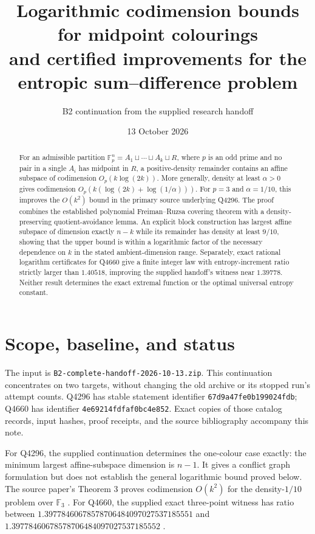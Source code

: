\documentclass[11pt]{article}
\title{\vspace{-12mm}\textbf{Logarithmic codimension bounds for midpoint colourings}\\[3pt]
\large and certified improvements for the entropic sum--difference problem}
\author{B2 continuation from the supplied research handoff}
\date{13 October 2026}
\theoremstyle{remark}
\newcommand{\Fp}{\mathbb F_p}
\newcommand{\Fthree}{\mathbb F_3}
\begin{document}
\maketitle
\vspace{-6mm}
\begin{abstract}
For an admissible partition $\Fp^n=A_1\sqcup\cdots\sqcup A_k\sqcup R$, where
$p$ is an odd prime and no pair in a single $A_i$ has midpoint in $R$, a
positive-density remainder contains an affine subspace of codimension
$O_p(k\log(2k))$. More generally, density at least $\alpha>0$ gives codimension
$O_p(k(\log(2k)+\log(1/\alpha)))$. For $p=3$ and $\alpha=1/10$, this improves
the $O(k^2)$ bound in the primary source underlying Q4296.
The proof combines the established polynomial Freiman--Ruzsa covering theorem
with a density-preserving quotient-avoidance lemma. An explicit block
construction has largest affine subspace of dimension exactly $n-k$ while
its remainder has density at least $9/10$, showing that the upper bound is
within a logarithmic factor of the necessary dependence on $k$ in the stated
ambient-dimension range. Separately, exact rational logarithm certificates
for Q4660 give a finite integer law with entropy-increment ratio strictly
larger than $1.40518$, improving the supplied handoff's witness near $1.39778$.
Neither result determines the exact extremal function or the optimal
universal entropy constant.
\end{abstract}

\section{Scope, baseline, and status}

The input is \texttt{B2-complete-handoff-2026-10-13.zip}. This continuation
concentrates on two targets, without changing the old archive or its stopped
run's attempt counts. Q4296 has stable statement identifier
\texttt{67d9a47fe0b199024fdb}; Q4660 has identifier
\texttt{4e69214fdfaf0bc4e852}. Exact copies of those catalog records, input
hashes, proof receipts, and the source bibliography accompany this note.

For Q4296, the supplied continuation determines the one-colour case exactly:
the minimum largest affine-subspace dimension is $n-1$. It gives a conflict
graph formulation but does not establish the general logarithmic bound
proved below. The source paper's Theorem 3 proves codimension $O(k^2)$
for the density-$1/10$ problem over $\Fthree$ \cite{midpoint}.
For Q4660, the supplied exact three-point witness has ratio between
$1.39778460678578706484097027537185551$ and
$1.39778460678578706484097027537185552$ \cite{handoff}.
\end{document}
